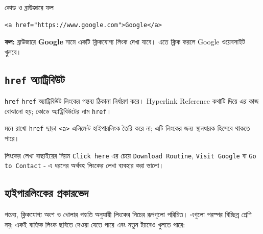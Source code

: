 \begin{chFourWholeExample}{কোড ও ব্রাউজারে ফল}
\noindent
\begin{minipage}[t]{.50\linewidth}\vspace{0pt}

\begin{verbatim}
<a href="https://www.google.com">Google</a>
\end{verbatim}

\end{minipage}\hfill
\begin{minipage}[t]{.46\linewidth}\vspace{0pt}
\textbf{ফল:} ব্রাউজারে \textbf{Google} নামে একটি ক্লিকযোগ্য লিংক দেখা যাবে। এতে ক্লিক করলে Google ওয়েবসাইট খুলবে।
\end{minipage}
\end{chFourWholeExample}

\subsection{\texttt{href} অ্যাট্রিবিউট}

\begin{definitionbox}{\texttt{href}}
\texttt{href} অ্যাট্রিবিউট লিংকের গন্তব্য ঠিকানা নির্ধারণ করে। Hyperlink Reference কথাটি দিয়ে এর কাজ বোঝানো হয়; কোডে অ্যাট্রিবিউটের নাম \texttt{href}।
\end{definitionbox}

\begin{keypointbox}{মনে রাখো}
\texttt{href} ছাড়া \texttt{<a>} এলিমেন্ট হাইপারলিংক তৈরি করে না; এটি লিংকের জন্য স্থানধারক হিসেবে থাকতে পারে।
\end{keypointbox}


\begin{keypointbox}{লিংকের লেখা বাছাইয়ের নিয়ম}
\texttt{Click here} এর চেয়ে \texttt{Download Routine}, \texttt{Visit Google} বা \texttt{Go to Contact} - এ ধরনের অর্থবহ লিংকের লেখা ব্যবহার করা ভালো।
\end{keypointbox}

\subsection{হাইপারলিংকের প্রকারভেদ}

গন্তব্য, ক্লিকযোগ্য অংশ ও খোলার পদ্ধতি অনুযায়ী লিংকের নিচের রূপগুলো পরিচিত। এগুলো পরস্পর বিচ্ছিন্ন শ্রেণি নয়; একই বাহ্যিক লিংক ছবিতে দেওয়া যেতে পারে এবং নতুন ট্যাবেও খুলতে পারে:

